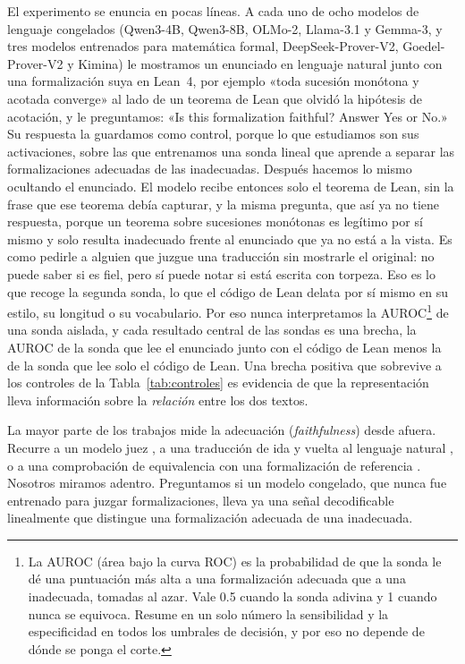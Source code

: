 \documentclass[10pt]{article}
\begin{document}
El experimento se enuncia en pocas líneas. A cada uno de ocho modelos de lenguaje congelados (Qwen3-4B, Qwen3-8B,
OLMo-2, Llama-3.1 y Gemma-3, y tres modelos entrenados para matemática formal, DeepSeek-Prover-V2, Goedel-Prover-V2 y
Kimina) le mostramos un enunciado en lenguaje natural junto con una formalización suya en Lean~4, por ejemplo «toda
sucesión monótona y acotada converge» al lado de un teorema de Lean que olvidó la hipótesis de acotación, y le
preguntamos: «Is this formalization faithful? Answer Yes or No.» Su respuesta la guardamos como control, porque lo que
estudiamos son sus activaciones, sobre las que entrenamos una sonda lineal que aprende a separar las formalizaciones
adecuadas de las inadecuadas. Después hacemos lo mismo ocultando el enunciado. El modelo recibe entonces solo el
teorema de Lean, sin la frase que ese teorema debía capturar, y la misma pregunta, que así ya no tiene respuesta,
porque un teorema sobre sucesiones monótonas es legítimo por sí mismo y solo resulta inadecuado frente al enunciado
que ya no está a la vista. Es como pedirle a alguien que juzgue una traducción sin mostrarle el original: no puede
saber si es fiel, pero sí puede notar si está escrita con torpeza. Eso es lo que recoge la segunda sonda, lo que el
código de Lean delata por sí mismo en su estilo, su longitud o su vocabulario. Por eso nunca interpretamos la
AUROC\footnote{La AUROC (área bajo la curva ROC) es la probabilidad de que la sonda le dé una puntuación más alta a
una formalización adecuada que a una inadecuada, tomadas al azar. Vale 0.5 cuando la sonda adivina y 1 cuando nunca se
equivoca. Resume en un solo número la sensibilidad y la especificidad en todos los umbrales de decisión, y por eso no
depende de dónde se ponga el corte.} de una sonda aislada, y cada resultado central de las sondas es una brecha, la
AUROC de la sonda que lee el enunciado junto con el código de Lean menos la de la sonda que lee solo el código de
Lean. Una brecha positiva que sobrevive a los controles de la Tabla~\ref{tab:controles} es evidencia de que la
representación lleva información sobre la \emph{relación} entre los dos textos.

La mayor parte de los trabajos mide la adecuación (\emph{faithfulness}) desde afuera. Recurre a un modelo juez
\citep{criticlean,formalalign,zhang2026beyondcompilation,wang2026formalrx}, a una traducción de ida y vuelta al
lenguaje natural \citep{amrollahi2026roundtrip}, o a una comprobación de equivalencia con una formalización de
referencia \citep{proofnetverif,mohammad2026faithfulnessgap}. Nosotros miramos adentro. Preguntamos si un modelo
congelado, que nunca fue entrenado para juzgar formalizaciones, lleva ya una señal decodificable linealmente que
distingue una formalización adecuada de una inadecuada.
\end{document}
